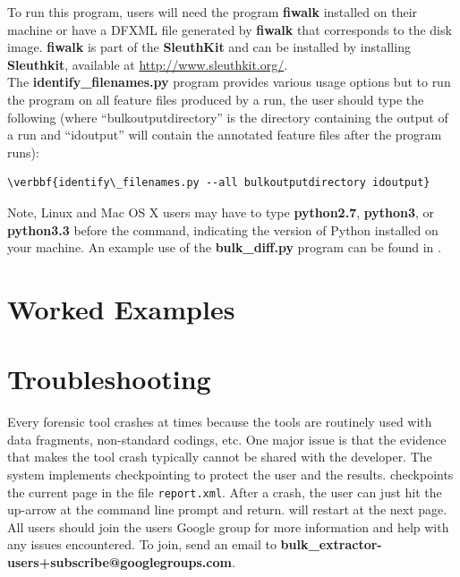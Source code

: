 \documentclass[11pt]{article} %
\begin{document}
To run this program, users will need the program \textbf{fiwalk} installed on their machine or have a DFXML file generated by \textbf{fiwalk} that corresponds to the disk image. \textbf{fiwalk} is part of the \textbf{SleuthKit} and can be installed by installing \textbf{Sleuthkit}, available at \url{http://www.sleuthkit.org/}.\\

The \textbf{identify\_filenames.py} program provides various usage options but to run the program on all feature files produced by a \bulk run, the user should type the following (where ``bulkoutputdirectory'' is the directory containing the output of a \bulk run and ``idoutput'' will contain the annotated feature files after the program runs):
\begin{Verbatim}[commandchars=\\\{\}]
\verbbf{identify\_filenames.py --all bulkoutputdirectory idoutput}
\end{Verbatim} 
Note, Linux and Mac OS X users may have to type \textbf{python2.7}, \textbf{python3}, or \textbf{python3.3} before the command, indicating the version of Python installed on your machine.  An example use of the \textbf{bulk\_diff.py} program can be found in .

\section{Worked Examples}
\label{Examples}


\section{Troubleshooting}
\label{DebuggingBulk}
Every forensic tool crashes at times because the tools are routinely used with data fragments, non-standard codings, etc. One major issue is that the evidence that makes the tool crash typically cannot be shared with the developer. The \bulk system implements checkpointing to protect the user and the results. \bulk checkpoints the current page in the file \texttt{report.xml}. After a crash, the user can just hit the up-arrow at the command line prompt and return. \bulk will restart at the next page. \\

All \bulk users should join the \bulk users Google group for more information and help with any issues encountered. To join, send an email to \textbf{bulk\_extractor-users+subscribe@googlegroups.com}.  \\
\end{document}
